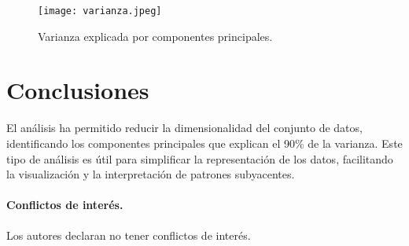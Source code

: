 \documentclass[a4paper, 10pt]{article}
\begin{document}
\begin{figure}[ht]
\centering
\texttt{[image: varianza.jpeg]}
\caption{Varianza explicada por componentes principales.}\label{fig:explained_variance}
\end{figure}

\section{Conclusiones}
El análisis ha permitido reducir la dimensionalidad del conjunto de datos, identificando los componentes principales que explican el 90\% de la varianza. Este tipo de análisis es útil para simplificar la representación de los datos, facilitando la visualización y la interpretación de patrones subyacentes.

\paragraph{Conflictos de interés.} Los autores declaran no tener conflictos de interés.
\end{document}
